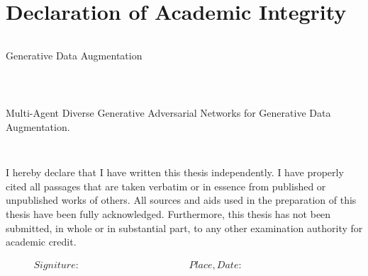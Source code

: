 \null\newpage
\section*{Declaration of Academic Integrity}
\thispagestyle{empty}
\begin{verbatim}

\end{verbatim}

\begin{center}
\begin{LARGE}\end{LARGE}

\begin{LARGE}Generative Data Augmentation\end{LARGE}
\\
\begin{verbatim}

\end{verbatim}

Multi-Agent Diverse Generative Adversarial Networks for Generative Data Augmentation.
\end{center}
\begin{verbatim}


\end{verbatim}
I hereby declare that I have written this thesis independently. I have properly cited all passages that are taken verbatim or in essence from published or unpublished works of others. All sources and aids used in the preparation of this thesis have been fully acknowledged. Furthermore, this thesis has not been submitted, in whole or in substantial part, to any other examination authority for academic credit.



\begin{displaymath}
\begin{array}{ll}
Signiture:~~~~~~~~~~~~~~~~~~~~~~~~~~~~~~~~~~~~~~~~~~~~~~
& Place, Date:~~~~~~~~~~~~~~~~~~~~~~~~~~~~~~~~~~~~~~~~~~
\end{array}
\end{displaymath}

